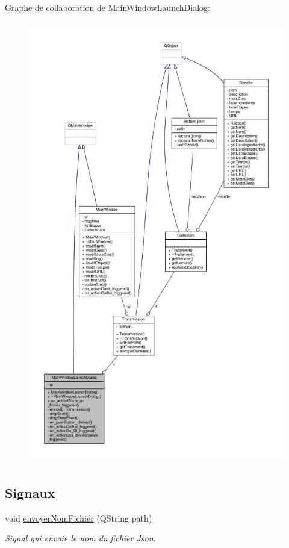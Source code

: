 Graphe de collaboration de Main\+Window\+Launch\+Dialog\+:\nopagebreak
\begin{figure}[H]
\begin{center}
\leavevmode
\includegraphics[height=550pt]{classMainWindowLaunchDialog__coll__graph}
\end{center}
\end{figure}
\subsection*{Signaux}
\begin{DoxyCompactItemize}
\item 
void \hyperlink{classMainWindowLaunchDialog_a290aac8c91df612c4aeea9e4ba4a0897}{envoyer\+Nom\+Fichier} (Q\+String path)
\begin{DoxyCompactList}\small\item\em Signal qui envoie le nom du fichier Json. \end{DoxyCompactList}\end{DoxyCompactItemize}
